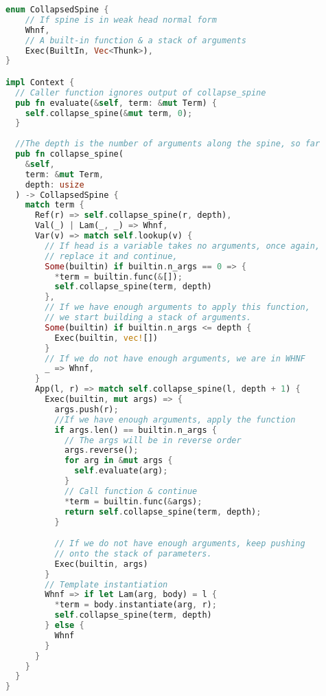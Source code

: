 \begin{lstlisting}[language=rust]
enum CollapsedSpine {
    // If spine is in weak head normal form
    Whnf,
    // A built-in function & a stack of arguments
    Exec(BuiltIn, Vec<Thunk>),
}

impl Context {
  // Caller function ignores output of collapse_spine
  pub fn evaluate(&self, term: &mut Term) {
    self.collapse_spine(&mut term, 0);
  }
  
  //The depth is the number of arguments along the spine, so far 
  pub fn collapse_spine(
    &self,
    term: &mut Term,
    depth: usize
  ) -> CollapsedSpine {
    match term {
      Ref(r) => self.collapse_spine(r, depth),
      Val(_) | Lam(_, _) => Whnf,
      Var(v) => match self.lookup(v) {
        // If head is a variable takes no arguments, once again,
        // replace it and continue,
        Some(builtin) if builtin.n_args == 0 => {
          *term = builtin.func(&[]);
          self.collapse_spine(term, depth)
        },
        // If we have enough arguments to apply this function,
        // we start building a stack of arguments.
        Some(builtin) if builtin.n_args <= depth {
          Exec(builtin, vec![])
        }
        // If we do not have enough arguments, we are in WHNF
        _ => Whnf,
      }
      App(l, r) => match self.collapse_spine(l, depth + 1) {
        Exec(builtin, mut args) => {
          args.push(r);
          //If we have enough arguments, apply the function 
          if args.len() == builtin.n_args {
            // The args will be in reverse order
            args.reverse();
            for arg in &mut args {
              self.evaluate(arg);
            }
            // Call function & continue
            *term = builtin.func(&args);
            return self.collapse_spine(term, depth);
          }

          // If we do not have enough arguments, keep pushing
          // onto the stack of parameters.
          Exec(builtin, args)
        } 
        // Template instantiation
        Whnf => if let Lam(arg, body) = l {
          *term = body.instantiate(arg, r);
          self.collapse_spine(term, depth)
        } else {
          Whnf
        }
      }
    }
  } 
}
\end{lstlisting}
